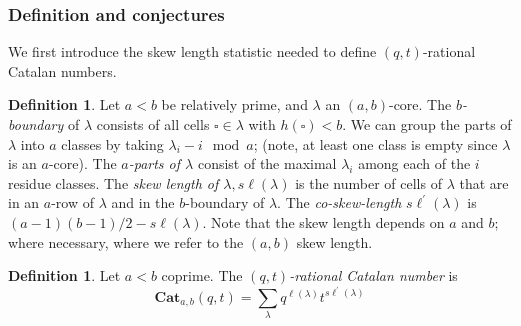\documentclass{amsart}[12pt]
\theoremstyle{definition}
\newtheorem{definition}[dummy]{Definition}
\newcommand{\Cat}{\mathbf{Cat}}
\newcommand{\sk}{s\ell}
\begin{document}
\subsubsection{Definition and conjectures}
We first introduce the skew length statistic needed to define $(q,t)$-rational Catalan numbers.
\begin{definition}
Let $a<b$ be relatively prime, and $\lambda$ an $(a,b)$-core. The \emph{$b$-boundary} of $\lambda$ consists of all cells $\square\in\lambda$ with $h(\square)<b$.
We can group the parts of $\lambda$ into $a$ classes by taking $\lambda_i-i\mod a$; (note, at least one class is empty since $\lambda$ is an $a$-core). The \emph{$a$-parts of $\lambda$} consist of the maximal $\lambda_i$ among each of the $i$ residue classes.
The \emph{skew length of $\lambda, \sk(\lambda)$} is the number of cells of $\lambda$ that are in an $a$-row of $\lambda$ and in the $b$-boundary of $\lambda$. The \emph{co-skew-length} $\sk^\prime(\lambda)$ is $(a-1)(b-1)/2-\sk(\lambda)$. Note that the skew length depends on $a$ and $b$; where necessary, where we refer to the $(a,b)$ skew length.
\end{definition}
\begin{definition}
Let $a<b$ coprime. The \emph{$(q,t)$-rational Catalan number} is
$$\Cat_{a,b}(q,t)=\sum_\lambda q^{\ell(\lambda)}t^{\sk^\prime(\lambda)}$$
\end{definition}
\end{document}
